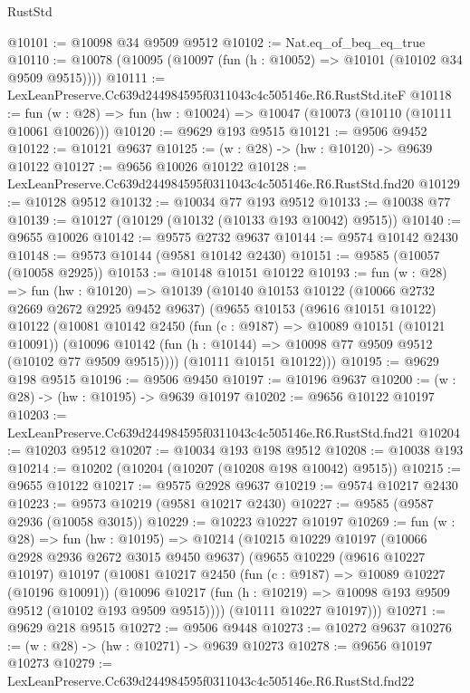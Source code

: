 \begin{lexlean}{RustStd}
\begin{coremodule}
@10101 := @10098 @34 @9509 @9512
@10102 := Nat.eq_of_beq_eq_true
@10110 := @10078 (@10095 (@10097 (fun (h : @10052) => @10101 (@10102 @34 @9509 @9515))))
@10111 := LexLeanPreserve.Cc639d244984595f0311043c4c505146e.R6.RustStd.iteF
@10118 := fun (w : @28) => fun (hw : @10024) => @10047 (@10073 (@10110 (@10111 @10061 @10026)))
@10120 := @9629 @193 @9515
@10121 := @9506 @9452
@10122 := @10121 @9637
@10125 := (w : @28) -> (hw : @10120) -> @9639 @10122
@10127 := @9656 @10026 @10122
@10128 := LexLeanPreserve.Cc639d244984595f0311043c4c505146e.R6.RustStd.fnd20
@10129 := @10128 @9512
@10132 := @10034 @77 @193 @9512
@10133 := @10038 @77
@10139 := @10127 (@10129 (@10132 (@10133 @193 @10042) @9515))
@10140 := @9655 @10026
@10142 := @9575 @2732 @9637
@10144 := @9574 @10142 @2430
@10148 := @9573 @10144 (@9581 @10142 @2430)
@10151 := @9585 (@10057 (@10058 @2925))
@10153 := @10148 @10151 @10122
@10193 := fun (w : @28) =>
  fun (hw : @10120) =>
  @10139
    (@10140
      @10153
      @10122
      (@10066 @2732 @2669 @2672 @2925 @9452 @9637)
      (@9655
        @10153
        (@9616 @10151 @10122)
        @10122
        (@10081
          @10142
          @2450
          (fun (c : @9187) => @10089 @10151 (@10121 @10091))
          (@10096 @10142 (fun (h : @10144) => @10098 @77 @9509 @9512 (@10102 @77 @9509 @9515))))
        (@10111 @10151 @10122)))
@10195 := @9629 @198 @9515
@10196 := @9506 @9450
@10197 := @10196 @9637
@10200 := (w : @28) -> (hw : @10195) -> @9639 @10197
@10202 := @9656 @10122 @10197
@10203 := LexLeanPreserve.Cc639d244984595f0311043c4c505146e.R6.RustStd.fnd21
@10204 := @10203 @9512
@10207 := @10034 @193 @198 @9512
@10208 := @10038 @193
@10214 := @10202 (@10204 (@10207 (@10208 @198 @10042) @9515))
@10215 := @9655 @10122
@10217 := @9575 @2928 @9637
@10219 := @9574 @10217 @2430
@10223 := @9573 @10219 (@9581 @10217 @2430)
@10227 := @9585 (@9587 @2936 (@10058 @3015))
@10229 := @10223 @10227 @10197
@10269 := fun (w : @28) =>
  fun (hw : @10195) =>
  @10214
    (@10215
      @10229
      @10197
      (@10066 @2928 @2936 @2672 @3015 @9450 @9637)
      (@9655
        @10229
        (@9616 @10227 @10197)
        @10197
        (@10081
          @10217
          @2450
          (fun (c : @9187) => @10089 @10227 (@10196 @10091))
          (@10096 @10217 (fun (h : @10219) => @10098 @193 @9509 @9512 (@10102 @193 @9509 @9515))))
        (@10111 @10227 @10197)))
@10271 := @9629 @218 @9515
@10272 := @9506 @9448
@10273 := @10272 @9637
@10276 := (w : @28) -> (hw : @10271) -> @9639 @10273
@10278 := @9656 @10197 @10273
@10279 := LexLeanPreserve.Cc639d244984595f0311043c4c505146e.R6.RustStd.fnd22

\end{coremodule}
\end{lexlean}

